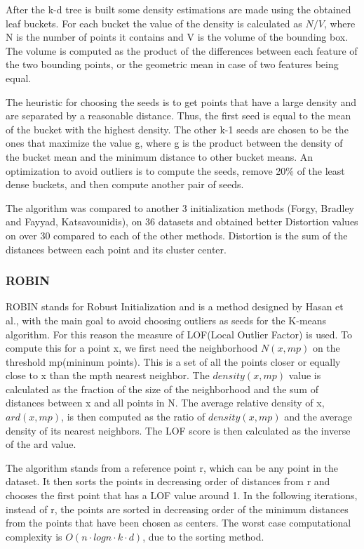 \documentclass[12pt]{article}
\begin{document}
	After the k-d tree is built some density estimations are made using the obtained leaf buckets. For each bucket the value of the density is calculated as \( N / V \), where N is the number of points it contains and V is the volume of the bounding box. The volume is computed as the product of the differences between each feature of the two bounding points, or the geometric mean in case of two features being equal. 
	
	The heuristic for choosing the seeds is to get points that have a large density and are separated by a reasonable distance. Thus, the first seed is equal to the mean of the bucket with the highest density. The other k-1 seeds are chosen to be the ones that maximize the value g, where g is the product between the density of the bucket mean and the minimum distance to other bucket means. An optimization to avoid outliers is to compute the seeds, remove 20\% of the least dense buckets, and then compute another pair of seeds.
	
	The algorithm was compared to another 3 initialization methods (Forgy, Bradley and Fayyad, Katsavounidis), on 36 datasets and obtained better Distortion values on over 30 compared to each of the other methods. Distortion is the sum of the distances between each point and its cluster center.
	
	\subsubsection{ROBIN}
	ROBIN stands for Robust Initialization and is a method designed by Hasan et al.\cite{ROBIN}, with the main goal to avoid choosing outliers as seeds for the K-means algorithm. For this reason the measure of LOF(Local Outlier Factor) is used. To compute this for a point x, we first need the neighborhood \(N(x, mp)\) on the threshold mp(mininum points). This is a set of all the points closer or equally close to x than the mpth nearest neighbor. The \(density(x, mp)\) value is calculated as the fraction of the size of the neighborhood and the sum of distances between x and all points in N. The average relative density of x, \(ard(x, mp)\), is then computed as the ratio of \(density(x, mp)\) and the average density of its nearest neighbors. The LOF score is then calculated as the inverse of the ard value. 
	
	The algorithm stands from a reference point r, which can be any point in the dataset. It then sorts the points in decreasing order of distances from r and chooses the first point that has a LOF value around 1. In the following iterations, instead of r, the points are sorted in decreasing order of the minimum distances from the points that have been chosen as centers. The worst case computational complexity is \(O(n\cdot logn\cdot k\cdot d)\), due to the sorting method.
	
\end{document}
